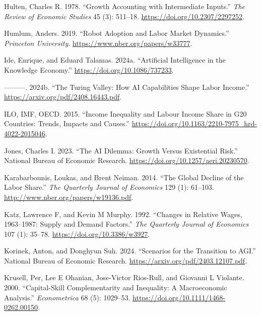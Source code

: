 \documentclass[
  11pt,
  letterpaper,
  DIV=11,
  numbers=noendperiod,
  oneside]{scrartcl}
\newlength{\cslhangindent}
\newenvironment{CSLReferences}[2] %
 {\begin{list}{}{%
  \setlength{\itemindent}{0pt}
  \setlength{\leftmargin}{0pt}
  \setlength{\parsep}{0pt}
  \ifodd #1
   \setlength{\leftmargin}{\cslhangindent}
   \setlength{\itemindent}{-1\cslhangindent}
  \fi
  \setlength{\itemsep}{#2\baselineskip}}}
 {\end{list}}
\begin{document}
\begin{CSLReferences}{1}{0}
Hulten, Charles R. 1978. {``Growth Accounting with Intermediate
Inputs.''} \emph{The Review of Economic Studies} 45 (3): 511--18.
\url{https://doi.org/10.2307/2297252}.

Humlum, Anders. 2019. {``Robot Adoption and Labor Market Dynamics.''}
\emph{Princeton University}. \url{https://www.nber.org/papers/w33777}.

Ide, Enrique, and Eduard Talamas. 2024a. {``Artificial Intelligence in
the Knowledge Economy.''} \url{https://doi.org/10.1086/737233}.

---------. 2024b. {``The Turing Valley: How AI Capabilities Shape Labor
Income.''} \url{https://arxiv.org/pdf/2408.16443.pdf}.

ILO, IMF, OECD. 2015. {``Income Inequality and Labour Income Share in
G20 Countries: Trends, Impacts and Causes.''}
\url{https://doi.org/10.1163/2210-7975_hrd-4022-2015046}.

Jones, Charles I. 2023. {``The AI Dilemma: Growth Versus Existential
Risk.''} National Bureau of Economic Research.
\url{https://doi.org/10.1257/aeri.20230570}.

Karabarbounis, Loukas, and Brent Neiman. 2014. {``The Global Decline of
the Labor Share.''} \emph{The Quarterly Journal of Economics} 129 (1):
61--103. \url{http://www.nber.org/papers/w19136.pdf}.

Katz, Lawrence F, and Kevin M Murphy. 1992. {``Changes in Relative
Wages, 1963--1987: Supply and Demand Factors.''} \emph{The Quarterly
Journal of Economics} 107 (1): 35--78.
\url{https://doi.org/10.3386/w3927}.

Korinek, Anton, and Donghyun Suh. 2024. {``Scenarios for the Transition
to AGI.''} National Bureau of Economic Research.
\url{https://arxiv.org/pdf/2403.12107.pdf}.

Krusell, Per, Lee E Ohanian, Jose-Victor Rios-Rull, and Giovanni L
Violante. 2000. {``Capital-Skill Complementarity and Inequality: A
Macroeconomic Analysis.''} \emph{Econometrica} 68 (5): 1029--53.
\url{https://doi.org/10.1111/1468-0262.00150}.


\end{CSLReferences}
\end{document}

